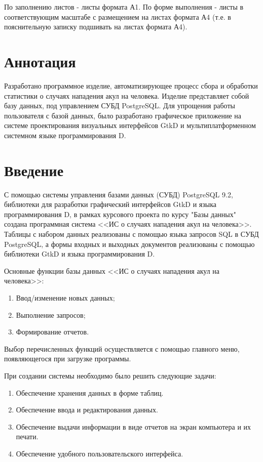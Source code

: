 \documentclass[russian,utf8,simple,emptystyle]{eskdtext}
\begin{document}
По заполнению листов - листы формата А1. По форме выполнения - листы в соответствующим масштабе с размещением на листах формата А4 (т.е. в пояснительную записку подшивать на листах формата А4).

\section{Аннотация}
Разработано программное изделие, автоматизирующее процесс сбора и обработки статистики о случаях нападения акул на человека. Изделие представляет собой базу данных, под управлением СУБД PostgreSQL. Для упрощения работы пользователя с базой данных, было разработано графическое приложение на системе проектирования визуальных интерфейсов GtkD и мультиплатформенном системном языке программирования D.
\clearpage

\section{Введение}
С помощью системы управления базами данных (СУБД) PostgreSQL 9.2, библиотеки для разработки графический интерфейсов GtkD и языка программирования D, в рамках курсового проекта по курсу "Базы данных" создана программная система <<ИС о случаях нападения акул на человека>>. Таблицы с набором данных реализованы с помощью языка запросов SQL в СУБД PostgreSQL, а формы входных и выходных документов реализованы с помощью библиотеки GtkD и языка программирования D.

Основные функции базы данных <<ИС о случаях нападения акул на человека>>:
\begin{enumerate}
\item Ввод/изменение новых данных;
\item Выполнение запросов;
\item Формирование отчетов.
\end{enumerate}

Выбор перечисленных функций осуществляется с помощью главного меню, появляющегося при загрузке программы.

При создании системы необходимо было решить следующие задачи:
\begin{enumerate}
\item Обеспечение хранения данных в форме таблиц.
\item Обеспечение ввода и редактирования данных.
\item Обеспечение выдачи информации в виде отчетов на экран компьютера и их печати.
\item Обеспечение удобного пользовательского интерфейса.
\end{enumerate}
\end{document}
